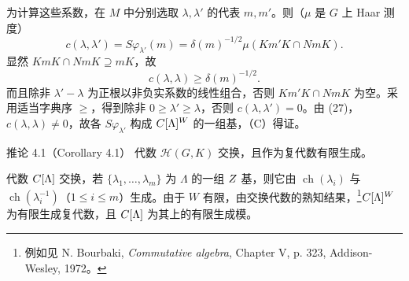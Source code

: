 为计算这些系数，在 $M$ 中分别选取 $\lambda,\lambda'$ 的代表 $m,m'$。则（$\mu$ 是 $G$ 上 Haar 测度）
\[
c(\lambda,\lambda')=S\varphi_{\lambda'}(m)=\delta(m)^{-1/2}\mu(Km'K\cap NmK).\tag{26}
\]
显然 $KmK\cap NmK\supseteq mK$，故
\[
c(\lambda,\lambda)\geq\delta(m)^{-1/2}.\tag{27}
\]
而且除非 $\lambda'-\lambda$ 为正根以非负实系数的线性组合，否则 $Km'K\cap NmK$ 为空。采用适当字典序 $\geq$，得到除非 $0\geq\lambda'\geq\lambda$，否则 $c(\lambda,\lambda')=0$。由 (27)，$c(\lambda,\lambda)\ne0$，故各 $S\varphi_{\lambda'}$ 构成 $C[\Lambda]^W$ 的一组基，（C）得证。
\begin{originaltheorem}{推论 4.1（Corollary 4.1）}
代数 $\mathcal H(G,K)$ 交换，且作为复代数有限生成。
\end{originaltheorem}
代数 $C[\Lambda]$ 交换，若 $\{\lambda_1,\ldots,\lambda_m\}$ 为 $\Lambda$ 的一组 $Z$ 基，则它由 $\operatorname{ch}(\lambda_i)$ 与 $\operatorname{ch}(\lambda_i^{-1})$（$1\le i\le m$）生成。由于 $W$ 有限，由交换代数的熟知结果，\footnote{例如见 N. Bourbaki, \emph{Commutative algebra}, Chapter V, p. 323, Addison-Wesley, 1972。}$C[\Lambda]^W$ 为有限生成复代数，且 $C[\Lambda]$ 为其上的有限生成模。

